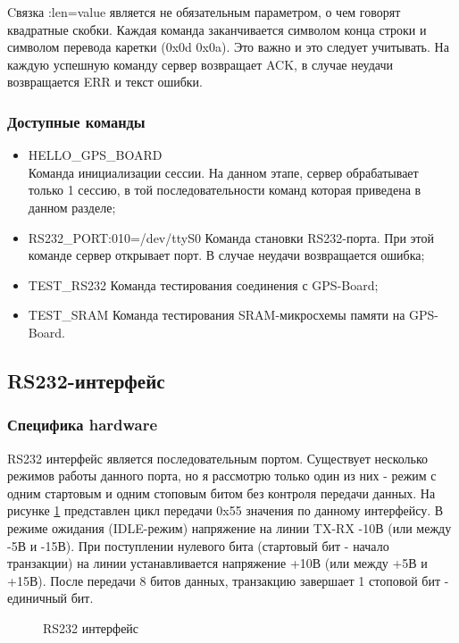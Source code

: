 Cвязка :len=value является не обязательным параметром, о чем говорят квадратные скобки. Каждая команда заканчивается символом конца строки
и символом перевода каретки (0x0d 0x0a). Это важно и это следует учитывать. На каждую успешную команду сервер возвращает ACK, в случае
неудачи возвращается ERR и текст ошибки.

\subsubsection{Доступные команды}
\begin{itemize}
\item HELLO\_GPS\_BOARD \\
	Команда инициализации сессии. На данном этапе, сервер обрабатывает только 1 сессию, в той последовательности команд которая приведена в 
	данном разделе;
\item RS232\_PORT:010=/dev/ttyS0
	Команда становки RS232-порта. При этой команде сервер открывает порт. В случае неудачи возвращается ошибка;
\item TEST\_RS232
	Команда тестирования соединения с GPS-Board;
\item TEST\_SRAM
	Команда тестирования SRAM-микросхемы памяти на GPS-Board.
\end{itemize}

\subsection{RS232-интерфейс}
\subsubsection{Специфика hardware}
RS232 интерфейс является последовательным портом. Существует несколько режимов работы данного порта, но я рассмотрю только один
из них - режим с одним стартовым и одним стоповым битом без контроля передачи данных. На рисунке \ref{pic:rs232_wire} представлен
цикл передачи 0x55 значения по данному интерфейсу. В режиме ожидания (IDLE-режим) напряжение на линии TX-RX -10В (или между -5В и -15В).
При поступлении нулевого бита (стартовый бит - начало транзакции) на линии устанавливается напряжение +10В (или между +5В и +15В).
После передачи 8 битов данных, транзакцию завершает 1 стоповой бит - единичный бит.

\begin{figure}[H]
\caption{RS232 интерфейс}
\label{pic:rs232_wire}
\end{figure}

